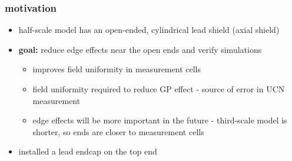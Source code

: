\documentclass{beamer}
\begin{document}
\begin{frame}
\frametitle{motivation}

    \begin{itemize}
        \item half-scale model has an open-ended, cylindrical lead shield (axial shield) \pause
        \item \textbf{goal:} reduce edge effects near the open ends and verify simulations \pause
            \begin{itemize}
                \item improves field uniformity in measurement cells \pause
                \item field uniformity required to reduce GP effect - source of error in UCN measurement \pause
                \item edge effects will be more important in the future - third-scale model is shorter,
                    so ends are closer to measurement cells\pause
            \end{itemize}
        \item installed a lead endcap on the top end
    \end{itemize}

\end{frame}
\end{document}
